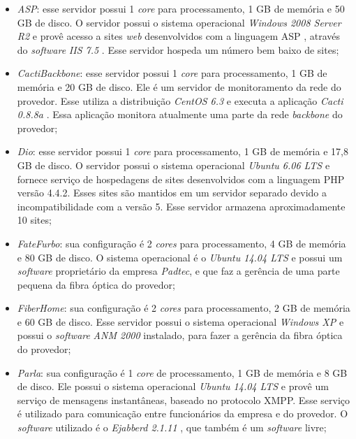 \begin{itemize}
 \item \textit{ASP}: esse servidor possui 1 \textit{core} para processamento, 1 GB de memória e 50 GB de disco. O servidor possui o sistema 
 operacional \textit{Windows 2008 Server R2} e provê acesso a sites \textit{web} desenvolvidos com a linguagem \ac{ASP} \cite{asp}, através do
 \textit{software} \textit{\ac{IIS} 7.5} \cite{iis}. Esse servidor hospeda um número bem baixo de sites;
 
 \item \textit{CactiBackbone}: esse servidor possui 1 \textit{core} para processamento, 1 GB de memória e 20 GB de disco. Ele é um servidor
 de monitoramento da rede do provedor. Esse utiliza a distribuição \textit{CentOS 6.3} \cite{centos} e executa a aplicação \textit{Cacti 0.8.8a}
 \cite{cacti}. Essa aplicação monitora atualmente uma parte da rede \textit{backbone} do provedor;
 
 \item \textit{Dio}: esse servidor possui 1 \textit{core} para processamento, 1 GB de memória e 17,8 GB de disco. O servidor possui o sistema 
 operacional \textit{Ubuntu 6.06 \ac{LTS}} \cite{ubuntu} e fornece serviço de hospedagens de sites desenvolvidos com a linguagem \ac{PHP} 
 versão 4.4.2. Esses sites são mantidos em um servidor separado devido a incompatibilidade com a versão 5. Esse servidor armazena 
 aproximadamente 10 sites;
 
 \item \textit{FateFurbo}: sua configuração é 2 \textit{cores} para processamento, 4 GB de memória e 80 GB de disco. O sistema operacional é o 
 \textit{Ubuntu 14.04 \ac{LTS}} \cite{ubuntu} e possui um \textit{software} proprietário da empresa \textit{Padtec}, e que faz a gerência de uma 
 parte pequena da fibra óptica do provedor;
 
 \item \textit{FiberHome}: sua configuração é 2 \textit{cores} para processamento, 2 GB de memória e 60 GB de disco. Esse servidor possui o sistema 
 operacional \textit{Windows XP} e possui o \textit{software} \textit{ANM 2000} instalado, para fazer a gerência da fibra óptica do provedor;
 
 \item \textit{Parla}: sua configuração é 1 \textit{core} de processamento, 1 GB de memória e 8 GB de disco. Ele possui o sistema
 operacional \textit{Ubuntu 14.04 \ac{LTS}} \cite{ubuntu} e provê um serviço de mensagens instantâneas, baseado no protocolo \ac{XMPP}. Esse 
 serviço é utilizado para comunicação entre funcionários da empresa e do provedor. O \textit{software} utilizado é o \textit{Ejabberd 2.1.11}
 \cite{ejabberd}, que também é um \textit{software} livre;


\end{itemize}
